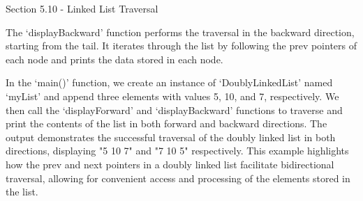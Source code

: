 \begin{notes}{Section 5.10 - Linked List Traversal}
\begin{highlight}
        The `displayBackward' function performs the traversal in the backward direction, starting from the tail. It iterates through the list by following the prev pointers of each node and prints the data stored in each node.
    
        In the `main()' function, we create an instance of `DoublyLinkedList' named `myList' and append three elements with values 5, 10, and 7, respectively. We then call the `displayForward' and `displayBackward' functions to traverse and print the contents of the list in both forward and backward directions. The output demonstrates 
        the successful traversal of the doubly linked list in both directions, displaying "5 10 7" and "7 10 5" respectively. This example highlights how the prev and next pointers in a doubly linked list facilitate bidirectional traversal, allowing for convenient access and processing of the elements stored in the list.
    \end{highlight}
\end{notes}

